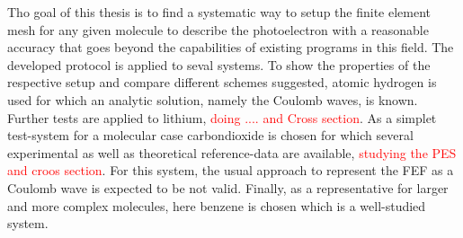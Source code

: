 Tho goal of this thesis is to find a systematic way to setup the finite element mesh for any given molecule to describe the photoelectron with a reasonable accuracy that goes beyond the capabilities of existing programs in this field.
The developed protocol is applied to seval systems.
To show the properties of the respective setup and compare different schemes suggested, atomic hydrogen is used for which an analytic solution, namely the Coulomb waves, is known.
Further tests are applied to lithium, \textcolor{red}{doing .... and Cross section}.
As a simplet test-system for a molecular case  carbondioxide is chosen for which several experimental as well as theoretical reference-data are available, \textcolor{red}{studying the PES and croos section}.
For this system, the usual approach to represent the FEF as a Coulomb wave is expected to be not valid.
Finally, as a representative for larger and more complex molecules, here benzene is chosen which is a well-studied system.
